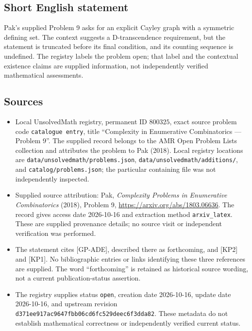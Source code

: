 \documentclass[11pt]{article}
\begin{document}
\subsection{Short English statement}
Pak's supplied Problem 9 asks for an explicit Cayley graph with a symmetric defining set. The context suggests a D-transcendence requirement, but the statement is truncated before its final condition, and its counting sequence is undefined. The registry labels the problem open; that label and the contextual existence claims are supplied information, not independently verified mathematical assessments.
\subsection{Sources}
\begin{itemize}
\item Local UnsolvedMath registry, permanent ID \(800325\), exact source problem code \texttt{catalogue entry}, title ``Complexity in Enumerative Combinatorics --- Problem 9''. The supplied record belongs to the AMR Open Problem Lists collection and attributes the problem to Pak (2018). Local registry locations are \texttt{data/unsolvedmath/problems.json}, \texttt{data/unsolvedmath/additions/}, and \texttt{catalog/problems.json}; the particular containing file was not independently inspected.
\item Supplied source attribution: Pak, \emph{Complexity Problems in Enumerative Combinatorics} (2018), Problem 9, \url{https://arxiv.org/abs/1803.06636}. The record gives access date 2026-10-16 and extraction method \texttt{arxiv\_latex}. These are supplied provenance details; no source visit or independent verification was performed.
\item The statement cites [GP-ADE], described there as forthcoming, and [KP2] and [KP1]. No bibliographic entries or links identifying these three references are supplied. The word ``forthcoming'' is retained as historical source wording, not a current publication-status assertion.
\item The registry supplies status \texttt{open}, creation date 2026-10-16, update date 2026-10-16, and upstream revision \texttt{d371ee917ac9647fbb06cd6fc529deec6f3dda82}. These metadata do not establish mathematical correctness or independently verified current status.
\end{itemize}
\end{document}
